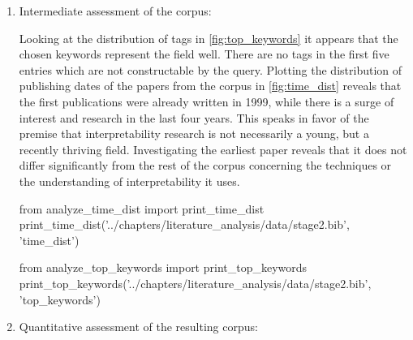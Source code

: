 \begin{enumerate}
	\item Intermediate assessment of the corpus:
	
	Looking at the distribution of tags in \autoref{fig:top_keywords} it appears that the chosen keywords represent the field well. There are no tags in the first five entries which are not constructable by the query.
	Plotting the distribution of publishing dates of the papers from the corpus in \autoref{fig:time_dist} reveals that the first publications were already written in 1999, while there is a surge of interest and research in the last four years. This speaks in favor of the premise that interpretability research is not necessarily a young, but a recently thriving field. Investigating the earliest paper \cite{tahaSymbolicInterpretationArtificial1999} reveals that it does not differ significantly from the rest of the corpus concerning the techniques or the understanding of interpretability it uses.

\begin{pycode}
from analyze_time_dist import print_time_dist
print_time_dist('../chapters/literature_analysis/data/stage2.bib', 'time_dist')
\end{pycode}

\begin{pycode}
from analyze_top_keywords import print_top_keywords
print_top_keywords('../chapters/literature_analysis/data/stage2.bib', 'top_keywords')
\end{pycode}
	
	\item Quantitative assessment of the resulting corpus:
	

\end{enumerate}
